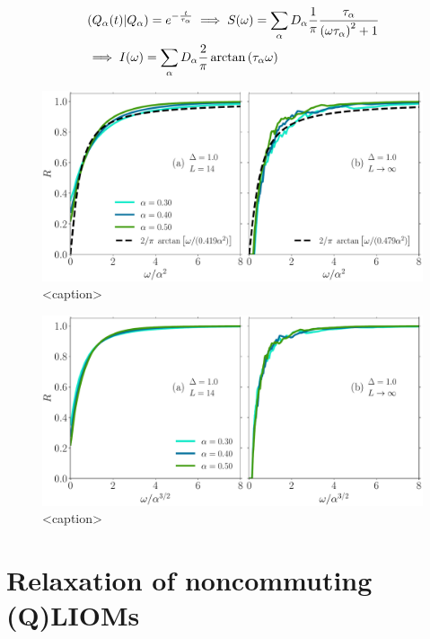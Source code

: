 \begin{align*}
  &\left(Q_{\alpha}(t) \middle| Q_{\alpha}\right) = e^{-\frac{t}{\tau_{\alpha}}} \implies 
  S(\omega) = \sum_{\alpha} D_{\alpha} \frac{1}{\pi}\frac{\tau_{\alpha}}{{\left(\omega \tau_{\alpha}\right)}^2 + 1}\\
  &\implies I(\omega) = \sum_{\alpha}D_{\alpha}\frac{2}{\pi} \arctan{(\tau_{\alpha}  \omega )}
\end{align*}


\begin{figure}[htbp]
  \centering
  \includegraphics[width=\textwidth]{Figures/current_scaling.pdf}
  \caption{<caption>}
  \label{fig:current decay scaling}
\end{figure}

\begin{figure}[htbp]
  \centering
  \includegraphics[width=\textwidth]{Figures/current_perfect_scaling.pdf}
  \caption{<caption>}
  \label{fig:current decay perfect scaling}
\end{figure}



\section{Relaxation of noncommuting (Q)LIOMs}
